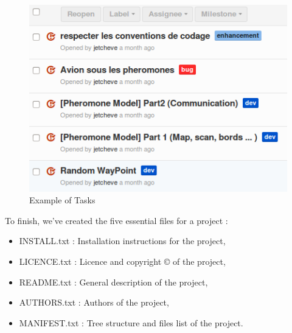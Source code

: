 \begin{figure}[!h]
\center
   \includegraphics[scale=0.7]{../images/tasks.png}
\caption{\label{Tasks}Example of Tasks}
\end{figure}


To finish, we've created the five essential files for a project :

\begin{itemize}
\item INSTALL.txt  : Installation instructions for the project,
\item LICENCE.txt  : Licence and copyright \copyright{} of the project,
\item README.txt   : General description of the project,
\item AUTHORS.txt  : Authors of the project,
\item MANIFEST.txt : Tree structure and files list of the project.
\end{itemize}
